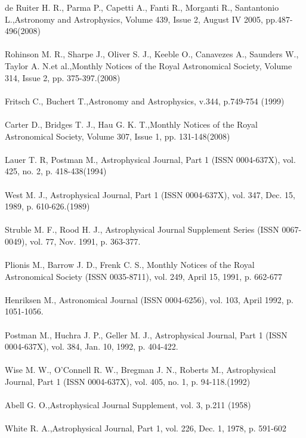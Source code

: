 de Ruiter H. R., Parma P., Capetti A., Fanti R., Morganti R., Santantonio L.,Astronomy and Astrophysics, Volume 439, Issue 2, August IV 2005, pp.487-496(2008)\\\\
Rohinson M. R., Sharpe J., Oliver S. J., Keeble O., Canavezes A., Saunders W., Taylor A. N.et al.,Monthly Notices of the Royal Astronomical Society, Volume 314, Issue 2, pp. 375-397.(2008)\\\\
Fritsch C., Buchert T.,Astronomy and Astrophysics, v.344, p.749-754 (1999)\\\\
Carter D., Bridges T. J., Hau G. K. T.,Monthly Notices of the Royal Astronomical Society, Volume 307, Issue 1, pp. 131-148(2008)\\\\
Lauer T. R, Postman M., Astrophysical Journal, Part 1 (ISSN 0004-637X), vol. 425, no. 2, p. 418-438(1994)\\\\
West M. J., Astrophysical Journal, Part 1 (ISSN 0004-637X), vol. 347, Dec. 15, 1989, p. 610-626.(1989)\\\\
Struble M. F., Rood H. J., Astrophysical Journal Supplement Series (ISSN 0067-0049), vol. 77, Nov. 1991, p. 363-377.\\\\
Plionis M., Barrow J. D., Frenk C. S., Monthly Notices of the Royal Astronomical Society (ISSN 0035-8711), vol. 249, April 15, 1991, p. 662-677\\\\
Henriksen M., Astronomical Journal (ISSN 0004-6256), vol. 103, April 1992, p. 1051-1056.\\\\
Postman M., Huchra J. P., Geller M. J., Astrophysical Journal, Part 1 (ISSN 0004-637X), vol. 384, Jan. 10, 1992, p. 404-422.\\\\
Wise M. W., O'Connell R. W., Bregman J. N., Roberts M., Astrophysical Journal, Part 1 (ISSN 0004-637X), vol. 405, no. 1, p. 94-118.(1992)\\\\
Abell G. O.,Astrophysical Journal Supplement, vol. 3, p.211 (1958)\\\\
White R. A.,Astrophysical Journal, Part 1, vol. 226, Dec. 1, 1978, p. 591-602\\\\
